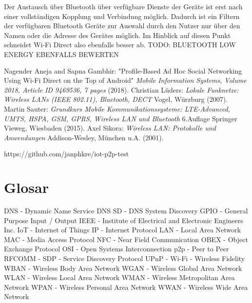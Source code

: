 \documentclass[12pt,a4paper]{article}
\begin{document}
       Der Austausch über Bluetooth über verfügbare Dienste der Geräte ist erst nach einer vollständigen Kopplung und Verbindung möglich.
       Dadurch ist ein Filtern der verfügbaren Bluetooth Geräte zur Auswahl durch den Nutzer nur über den Namen oder die Adresse des Gerätes möglich.
       Im Hinblick auf diesen Punkt schneidet Wi-Fi Direct also ebenfalls besser ab. TODO: BLUETOOTH LOW ENERGY EBENFALLS BEWERTEN
    \pagebreak
    \begin{thebibliography}{10}
        Nagender Aneja and Sapna Gambhir: "Profile-Based Ad Hoc Social Networking Using Wi-Fi Direct on the Top of Android" {\it Mobile Information Systems, Volume 2018, Article ID 9469536, 7 pages} (2018).
        Christian Lüders: {\it Lokale Funknetze: Wireless LANs (IEEE 802.11), Bluetooth, DECT} Vogel, Würzburg (2007).
        Martin Sauter: {\it Grundkurs Mobile Kommunikationssysteme: LTE-Advanced, UMTS, HSPA, GSM, GPRS, Wireless LAN und Bluetooth} 6.Auflage Springer Vieweg, Wiesbaden (2015).
        Axel Sikora: {\it Wireless LAN: Protokolle und Anwendungen} Addison-Wesley, München u.A. (2001).

        https://github.com/janphkre/iot-p2p-test
    \end{thebibliography}

    \section{Glosar}
        DNS - Dynamic Name Service
        DNS SD - DNS System Discovery
        GPIO - General Purpose Input / Output
        IEEE - Institute of Electrical and Electronic Engineers Inc.
        IoT - Internet of Things
        IP - Internet Protocol
        LAN - Local Area Network
        MAC - Media Access Protocol
        NFC - Near Field Communication
        OBEX - Object Exchange Protocol
        OSI - Open Systems Interconnection
        p2p - Peer to Peer
        RFCOMM - 
        SDP - Service Discovery Protocol
        UPnP - 
        Wi-Fi - Wireless Fidelity
        WBAN - Wireless Body Area Network
        WGAN - Wireless Global Area Network
        WLAN - Wireless Local Area Network
        WMAN - Wireless Metropolitan Area Network
        WPAN - Wireless Personal Area Network
        WWAN - Wireless Wide Area Network
\end{document}

